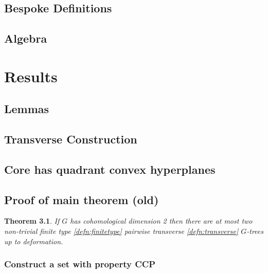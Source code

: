 \documentclass[12pt,parskip=full]{report}
\theoremstyle{plain}
\newtheorem{thm}{Theorem}[section]
\newtheorem{lem}[thm]{Lemma}
\theoremstyle{definition}
\begin{document}
\section{Bespoke Definitions}

\section{Algebra}


\chapter{Results}

\section{Lemmas}

















\section{Transverse Construction}


\section{Core has quadrant convex hyperplanes}


\section{Proof of main theorem (old)}

\begin{thm}
    \label{thm:mainresult}
    If \(G\) has cohomological dimension 2 then there are at most two non-trivial finite type \ref{defn:finitetype} pairwise transverse \ref{defn:transverse} \(G\)-trees up to deformation.
\end{thm}

\subsection{Construct a set with property CCP}
        
\end{document}
